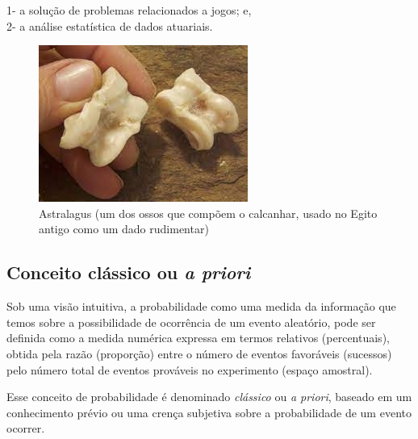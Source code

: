 \documentclass[
]{book}
\begin{document}
\hfill\break

1- a solução de problemas relacionados a jogos; e,\\
2- a análise estatística de dados atuariais.

\hfill\break

\begin{figure}

{\centering \includegraphics[width=0.8\linewidth]{images4/astralagus} 

}

\caption{Astralagus (um dos ossos que compõem o calcanhar, usado no Egito antigo como um dado rudimentar)}\label{fig:unnamed-chunk-60}
\end{figure}

\hypertarget{conceito-cluxe1ssico-ou-a-priori}{%
\subsection{\texorpdfstring{Conceito clássico ou \emph{a priori}}{Conceito clássico ou a priori}}\label{conceito-cluxe1ssico-ou-a-priori}}

Sob uma visão intuitiva, a probabilidade como uma medida da informação que temos sobre a possibilidade de ocorrência de um evento aleatório, pode ser definida como a medida numérica expressa em termos relativos (percentuais), obtida pela razão (proporção) entre o número de eventos favoráveis (sucessos) pelo número total de eventos prováveis no experimento (espaço amostral).

\hfill\break

Esse conceito de probabilidade é denominado \emph{clássico} ou \emph{a priori}, baseado em um conhecimento prévio ou uma crença subjetiva sobre a probabilidade de um evento ocorrer.
\end{document}
